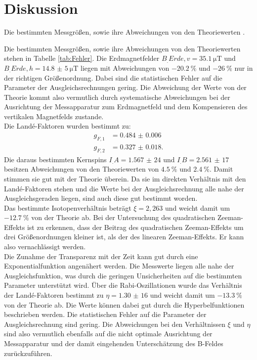 
\section{Diskussion}
\label{sec:Diskussion}

\begin{table}
	\centering
	\caption{Die bestimmten Messgrößen, sowie ihre Abweichungen von den Theoriewerten \cite{erde,verhaeltnis,V21}.}
	
	\label{tab:Fehler}
\end{table}

Die bestimmten Messgrößen, sowie ihre Abweichungen von den Theoriewerten stehen in Tabelle \ref{tab:Fehler}. 
Die Erdmagnetfelder $B_.{Erde,v} = \SI{35,1}{\micro\tesla}$ und $B_.{Erde,h}=\SI{14,8(5)}{\micro\tesla}$ liegen mit Abweichungen von $\SI{-20,2}{\%}$ und $\SI{-26}{\%}$ nur in der richtigen Größenordnung. Dabei sind die statistischen Fehler auf die Parameter der Ausgleichsrechnungen gering. Die Abweichung der Werte von der Theorie kommt also vermutlich durch systematische Abweichungen bei der Ausrichtung der Messapparatur zum Erdmagnetfeld und dem Kompensieren des vertikalen Magnetfelds zustande.\\
Die Landé-Faktoren wurden bestimmt zu:
\begin{align*}
g_{F,1} &= \num{0.484(6)}\\
g_{F,2} &= \num{0.327(18)}\text{.}
\end{align*}
Die daraus bestimmten Kernspins $I_.A= \num{1,567(24)}$ und $I_.B=\num{2,561(17)}$ besitzen Abweichungen von den Theoriewerten von $\SI{4,5}{\%}$ und $\SI{2,4}{\%}$. Damit stimmen sie gut mit der Theorie überein. Da sie im direkten Verhältnis mit den Landé-Faktoren stehen und die Werte bei der Ausgleichsrechnung alle nahe der Ausgleichsgeraden liegen, sind auch diese gut bestimmt worden.\\
Das bestimmte Isotopenverhältnis beträgt $\xi=2,263$ und weicht damit um $\SI{-12.7}{\%}$ von der Theorie ab.
Bei der Untersuchung des quadratischen Zeeman-Effekts ist zu erkennen, dass der Beitrag des quadratischen Zeeman-Effekts um drei Größenordnungen kleiner ist, als der des linearen Zeeman-Effekts. Er kann also vernachlässigt werden.\\
Die Zunahme der Transparenz mit der Zeit kann gut durch eine Exponentialfunktion angenähert werden. Die Messwerte liegen alle nahe der Ausgleichsfunktion, was durch die geringen Unsicherheiten auf die bestimmten Parameter unterstützt wird. 
Über die Rabi-Oszillationen wurde das Verhältnis der Landé-Faktoren bestimmt zu $\eta=\num{1,30(16)}$ und weicht damit um $\SI{-13.3}{\%}$ von der Theorie ab. Die Werte können dabei gut durch die Hyperbelfunktionen beschrieben werden. Die statistischen Fehler auf die Parameter der Ausgleichsrechnung sind gering. Die Abweichungen bei den Verhältnissen $\xi$ und $\eta$ sind also vermutlich ebenfalls auf die nicht optimale Ausrichtung der Messapparatur und der damit eingehenden Unterschätzung des B-Feldes zurückzuführen. 

